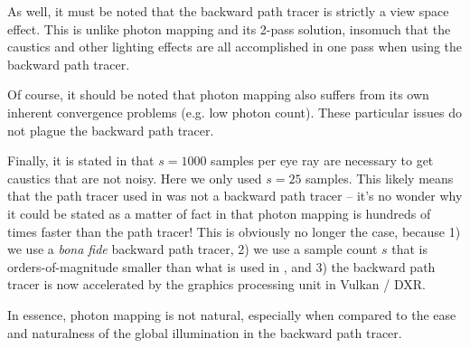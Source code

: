 \documentclass[12pt]{article}
\begin{document}
\begin{appendix}
As well, it must be noted that the backward path tracer is strictly a view space effect.
This is unlike photon mapping and its 2-pass solution, insomuch that the caustics and other lighting effects are all accomplished in one pass when using the backward path tracer.

Of course, it should be noted that photon mapping also suffers from its own inherent convergence problems (e.g. low photon count).
These particular issues do not plague the backward path tracer.

Finally, it is stated in \cite{jensen} that $s = 1000$ samples per eye ray are necessary to get caustics that are not noisy.
Here we only used $s = 25$ samples.
This likely means that the path tracer used in \cite{jensen} was not a backward path tracer -- it's no wonder why it could be stated as a matter of fact in \cite{jensen} that photon mapping is hundreds of times faster than the path tracer!
This is obviously no longer the case, because 1) we use a {\textit{bona fide}} backward path tracer, 2) we use a sample count $s$ that is orders-of-magnitude smaller than what is used in \cite{jensen}, and 3) the backward path tracer is now accelerated by the graphics processing unit in Vulkan / DXR.

In essence, photon mapping is not natural, especially when compared to the ease and naturalness of the global illumination in the backward path tracer.




\end{appendix}
\end{document}
